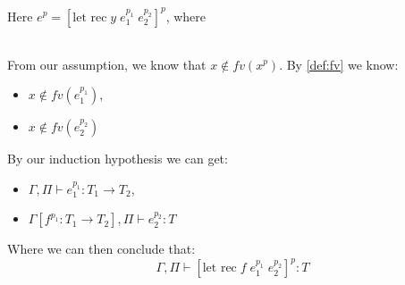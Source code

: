 \item[\runa{T-Let-rec}] Here $e^p=[\mbox{let rec}\; y \; e_1^{p_1} \; e_2^{p_2}]^p$, where
\begin{figure}[H]
	\setlength\tabcolsep{8pt}
	\begin{tabular}{l}
		
	\end{tabular}
\end{figure}
From our assumption, we know that $x\notin fv(x^p)$.
By \cref{def:fv} we know:
\begin{itemize}
	\item $x\notin fv(e_1^{p_1})$,
	\item $x\notin fv(e_2^{p_2})$
\end{itemize}
By our induction hypothesis we can get:
\begin{itemize}
	\item $\Gamma,\Pi\vdash e_1^{p_1}:T_1\rightarrow T_2$,
	\item $\Gamma[f^{p_1}:T_1\rightarrow T_2],\Pi\vdash e_2^{p_2}:T$
\end{itemize}
Where we can then conclude that:
$$\Gamma,\Pi\vdash [\mbox{let rec}\; f \; e_1^{p_1} \; e_2^{p_2}]^{p}:T$$
